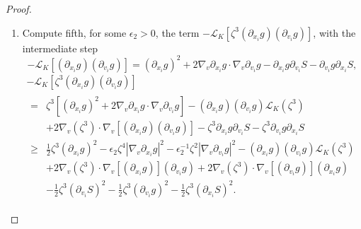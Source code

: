 \documentclass[AHL,Unicode,longabstracts,published]{cedram}
\newcommand{\cL}{\mathcal{L}}
\begin{document}
\begin{proof}
\begin{enumerate}
\item \label{proofprop3.1.v}Compute fifth, for some $\epsilon_2>0$, the term $-\cL_K [\zeta^3 (\partial_{x_i}g) (\partial_{v_i} g)]$, with the intermediate step
\[
- \cL_K \left[(\partial_{x_i} g)(\partial_{v_i} g)\right] = (\partial_{x_i} g)^2 + 2 \nabla_v \partial_{x_i} g \cdot \nabla_v \partial_{v_i} g -\partial_{x_i}g \partial_{v_i}S - \partial_{v_i} g \partial_{x_i}S,
\]
\begin{multline}\label{eq:barzeta}
- \cL_K \left[\zeta^3 (\partial_{x_i} g)\left(\partial_{v_i} g\right)\right]\\
\begin{aligned}
= &\zeta^3 \left[(\partial_{x_i} g)^2 + 2 \nabla_v \partial_{x_i} g \cdot \nabla_v \partial_{v_i} g
\right] - \left(\partial_{x_i}g\right)\left(\partial_{v_i} g\right) \cL_K (\zeta^3) \\
&+ 2 \nabla_v (\zeta^3) \cdot \nabla_v \left[(\partial_{x_i} g)(\partial_{v_i}g)\right] - \zeta^3 \partial_{x_i}g
\partial_{v_i}S - \zeta^3 \partial_{v_i}g \partial_{x_i}S \\
\ge & \frac12 \zeta^3 \left(\partial_{x_i} g\right)^2 - \epsilon_2 \zeta^4 \left|\nabla_v
\partial_{x_i}g\right|^2 - \epsilon_2^{-1} \zeta^2 \left|\nabla_v \partial_{v_i} g \right|^2
-(\partial_{x_i}g)(\partial_{v_i} g) \cL_K (\zeta^3) \\
& + 2 \nabla_v (\zeta^3) \cdot \nabla_v \left[(\partial_{x_i} g)\right] (\partial_{v_i}g) + 2 \nabla_v (\zeta^3) \cdot \nabla_v \left[(\partial_{v_i}g)\right] \left(\partial_{x_i} g\right) \\
& - \frac12 \zeta^3 \left(\partial_{v_i}S\right)^2 - \frac12 \zeta^3 \left(\partial_{v_i}g\right)^2 - \frac12 \zeta^3 \left(\partial_{x_i}S\right)^2.
\end{aligned}
\end{multline}
\end{enumerate}



\end{proof}
\end{document}
